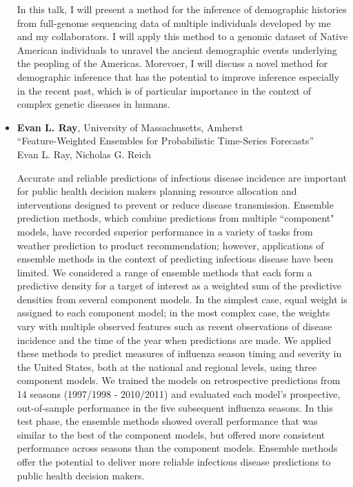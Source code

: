 \begin{itemize}
In this talk, I will present a method for the inference of demographic histories from full-genome sequencing data of multiple individuals developed by me and my collaborators. I will apply this method to a genomic dataset of Native American individuals to unravel the ancient demographic events underlying the peopling of the Americas. Morevoer, I will discuss a novel method for demographic inference that has the potential to improve inference especially in the recent past, which is of particular importance in the context of complex genetic diseases in humans.

\item \textbf{Evan L. Ray}, University of Massachusetts, Amherst \\
``Feature-Weighted Ensembles for Probabilistic Time-Series Forecasts'' \\
Evan L. Ray, Nicholas G. Reich


Accurate and reliable predictions of infectious disease incidence are important for public health decision makers planning resource allocation and interventions designed to prevent or reduce disease transmission. Ensemble prediction methods, which combine predictions from multiple ``component" models, have recorded superior performance in a variety of tasks from weather prediction to product recommendation; however, applications of ensemble methods in the context of predicting infectious disease have been limited. We considered a range of ensemble methods that each form a predictive density for a target of interest as a weighted sum of the predictive densities from several component models. In the simplest case, equal weight is assigned to each component model; in the most complex case, the weights vary with multiple observed features such as recent observations of disease incidence and the time of the year when predictions are made. We applied these methods to predict measures of influenza season timing and severity in the United States, both at the national and regional levels, using three component models. We trained the models on retrospective predictions from 14 seasons (1997/1998 - 2010/2011) and evaluated each model's prospective, out-of-sample performance in the five subsequent influenza seasons. In this test phase, the ensemble methods showed overall performance that was similar to the best of the component models, but offered more consistent performance across seasons than the component models. Ensemble methods offer the potential to deliver more reliable infectious disease predictions to public health decision makers.


\end{itemize}
